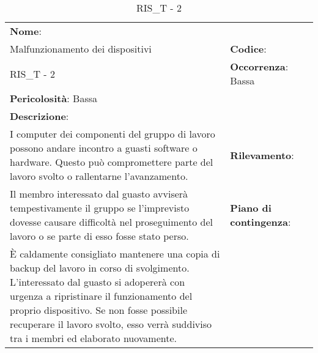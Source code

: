\renewcommand{\arraystretch}{1.5}
\begin{longtable} { 
		>{\raggedright}p{} 
		>{\raggedright}p{} 
		>{\raggedright}p{}    }
	
	\caption{RIS\_T - 2} \endhead	
	
	
	\textbf{Nome}: \\ Malfunzionamento dei dispositivi
	& \textbf{Codice}: \\ RIS\_T - 2  
	& \textbf{Occorrenza}: Bassa \\ \textbf{Pericolosità}: Bassa
	
	\tabularnewline
	
	\textbf{Descrizione}: \\ I computer dei componenti del gruppo di lavoro possono andare incontro a guasti software o hardware. Questo può compromettere parte del lavoro svolto o rallentarne l'avanzamento.
	& 
	\textbf{Rilevamento}: \\ Il membro interessato dal guasto avviserà tempestivamente il gruppo se l'imprevisto dovesse causare difficoltà nel proseguimento del lavoro o se parte di esso fosse stato perso.
		
	&  
	\textbf{Piano di contingenza}: \\ \`E caldamente consigliato mantenere una copia di backup del lavoro in corso di svolgimento. L'interessato dal guasto si adopererà con urgenza a ripristinare il funzionamento del proprio dispositivo. Se non fosse possibile recuperare il lavoro svolto, esso verrà suddiviso tra i membri ed elaborato nuovamente.
	
\end{longtable}



